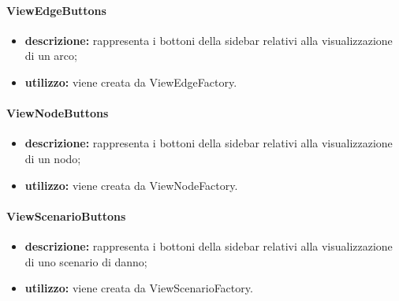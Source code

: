 \paragraph{ViewEdgeButtons}
\begin{itemize}
	\item \textbf{descrizione:} rappresenta i bottoni della sidebar relativi alla visualizzazione di un arco;
	\item \textbf{utilizzo:} viene creata da ViewEdgeFactory.
\end{itemize}
\paragraph{ViewNodeButtons}
\begin{itemize}
	\item \textbf{descrizione:} rappresenta i bottoni della sidebar relativi alla visualizzazione di un nodo;
	\item \textbf{utilizzo:} viene creata da ViewNodeFactory.
\end{itemize}
\paragraph{ViewScenarioButtons}
\begin{itemize}
	\item \textbf{descrizione:} rappresenta i bottoni della sidebar relativi alla visualizzazione di uno scenario di danno;
	\item \textbf{utilizzo:} viene creata da ViewScenarioFactory.
\end{itemize}
\newpage

